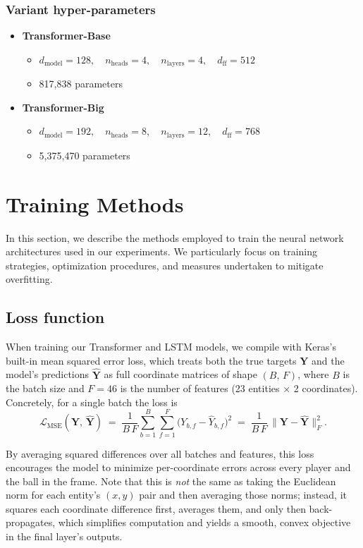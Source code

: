 \documentclass[sigconf]{acmart}
\begin{document}
\subsubsection{Variant hyper-parameters}
\begin{itemize}
    \item \textbf{Transformer-Base}
        \begin{itemize}
          \item $d_{\text{model}}=128,\quad n_{\text{heads}}=4,\quad n_{\text{layers}}=4,\quad d_{\text{ff}}=512$
          \item 817,838 parameters
        \end{itemize}
  \item \textbf{Transformer-Big}
    \begin{itemize}
      \item $d_{\text{model}}=192,\quad n_{\text{heads}}=8,\quad n_{\text{layers}}=12,\quad d_{\text{ff}}=768$
      \item 5,375,470 parameters
      \end{itemize}
\end{itemize}

\section{Training Methods}

In this section, we describe the methods employed to train the neural network architectures used in our experiments. We particularly focus on training strategies, optimization procedures, and measures undertaken to mitigate overfitting.

\subsection{Loss function}

When training our Transformer and LSTM models, we compile with Keras’s built-in mean squared error loss, which treats both the true targets
$\mathbf{Y}$ and the model’s predictions $\hat{\mathbf{Y}}$ as full coordinate matrices of shape $(B,\,F)$, where $B$ is the batch size and $F = 46$ is the number of features (23 entities $\times$ 2 coordinates). Concretely, for a single batch the loss is
\[
\mathcal{L}_{\mathrm{MSE}}(\mathbf{Y},\,\hat{\mathbf{Y}})
\;=\;\frac{1}{B\,F}
\sum_{b=1}^{B}\sum_{f=1}^{F}\bigl(Y_{b,f}-\hat Y_{b,f}\bigr)^{2}
\;=\;\frac{1}{B\,F}\,\bigl\|\mathbf{Y}-\hat{\mathbf{Y}}\bigr\|_{F}^{2}.
\]

By averaging squared differences over all batches and features, this loss encourages the model to minimize per-coordinate errors across every player and the ball in the frame. Note that this is \emph{not} the same as taking the Euclidean norm for each entity’s $(x,y)$ pair and then averaging those norms; instead, it squares each coordinate difference first, averages them, and only then back-propagates, which simplifies computation and yields a smooth, convex objective in the final layer’s outputs.
 
\end{document}
